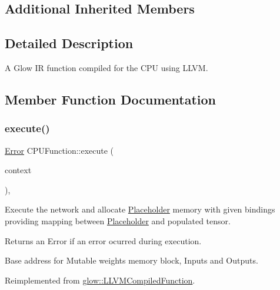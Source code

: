 \subsection*{Additional Inherited Members}


\subsection{Detailed Description}
A Glow IR function compiled for the C\+PU using L\+L\+VM. 

\subsection{Member Function Documentation}
\mbox{\label{classglow_1_1_c_p_u_function_a31625d840ca33030c6762955c93d82a1}} 
\subsubsection{\texorpdfstring{execute()}{execute()}}
{\footnotesize\ttfamily \hyperlink{namespaceglow_afdb176c3a672ef66db0ecfc19a8d39bf}{Error} C\+P\+U\+Function\+::execute (\begin{DoxyParamCaption}\item[{\hyperlink{classglow_1_1_execution_context}{Execution\+Context} $\ast$}]{context }\end{DoxyParamCaption})\hspace{0.3cm}{\ttfamily [override]}, {\ttfamily [virtual]}}

Execute the network and allocate \hyperlink{classglow_1_1_placeholder}{Placeholder} memory with given {\ttfamily bindings} providing mapping between \hyperlink{classglow_1_1_placeholder}{Placeholder} and populated tensor. \begin{DoxyReturn}{Returns}
an Error if an error ocurred during execution. 
\end{DoxyReturn}
Base address for Mutable weights memory block, Inputs and Outputs. 

Reimplemented from \hyperlink{classglow_1_1_l_l_v_m_compiled_function_a5589e30446aa3a92f3e94267bded99ae}{glow\+::\+L\+L\+V\+M\+Compiled\+Function}.

\mbox{\label{classglow_1_1_c_p_u_function_a4bf0faf1e98bcf21ec058c031df3c036}} 
